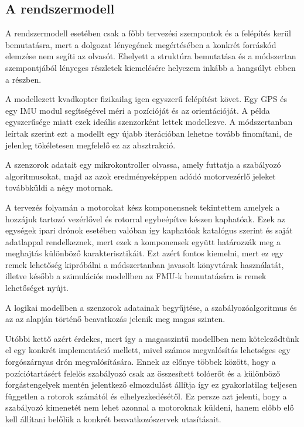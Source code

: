     \subsection{A rendszermodell}
    A rendszermodell esetében csak a főbb tervezési szempontok és a felépítés kerül bemutatásra, mert a dolgozat lényegének megértésében a konkrét forráskód elemzése nem segíti az olvasót. Ehelyett a struktúra bemutatása és a módszertan szempontjából lényeges részletek kiemelésére helyezem inkább a hangsúlyt ebben a részben.
    
    A modellezett kvadkopter fizikailag igen egyszerű felépítést követ. Egy GPS és egy IMU modul segítségével méri a pozícióját és az orientációját. A példa egyszerűsége miatt ezek ideális szenzorként lettek modellezve.
    A módszertanban leírtak szerint ezt a modellt egy újabb iterációban lehetne tovább finomítani, de jelenleg tökéletesen megfelelő ez az absztrakció.
    
    A szenzorok adatait egy mikrokontroller olvassa, amely futtatja a szabályozó algoritmusokat, majd az azok eredményeképpen adódó motorvezérlő jeleket továbbküldi a négy motornak.
    
    A tervezés folyamán a motorokat kész komponensnek tekintettem amelyek a hozzájuk tartozó vezérlővel és rotorral egybeépítve készen kaphatóak. Ezek az egységek ipari drónok esetében valóban így kaphatóak katalógus szerint és saját adatlappal rendelkeznek, mert ezek a komponensek együtt határozzák meg a meghajtás különböző karakterisztikáit.
    Ezt azért fontos kiemelni, mert ez egy remek lehetőség kipróbálni a módszertanban javasolt könyvtárak használatát, illetve később a szimulációs modellben az FMU-k bemutatására is remek lehetőséget nyújt.
    
    A logikai modellben a szenzorok adatainak begyűjtése, a szabályozóalgoritmus és az az alapján történő beavatkozás jelenik meg magas szinten.
    
    Utóbbi kettő azért érdekes, mert így a magasszintű modellben nem köteleződtünk el egy konkrét implementáció mellett, mivel számos megvalósítás lehetséges egy forgószárnyas drón megvalósítására. Ennek az előnye többek között, hogy a pozíciótartásért felelős szabályozó csak az összesített tolóerőt és a különböző forgástengelyek mentén jelentkező elmozdulást állítja így ez gyakorlatilag teljesen független a rotorok számától és elhelyezkedésétől.
    Ez persze azt jelenti, hogy a szabályozó kimenetét nem lehet azonnal a motoroknak küldeni, hanem előbb elő kell állítani belőlük a konkrét beavatkozószervek utasításait.
    
